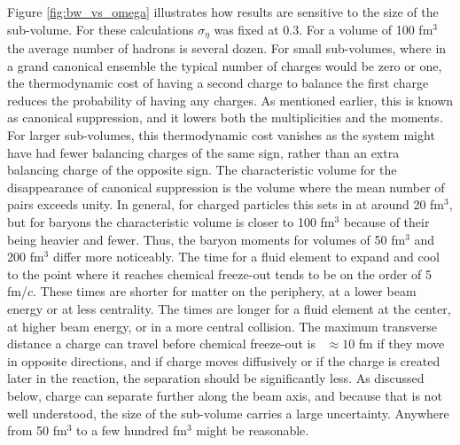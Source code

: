 Figure \ref{fig:bw_vs_omega} illustrates how results are sensitive to the size of the sub-volume. For these calculations $\sigma_\eta$ was fixed at 0.3. For a volume of 100 fm$^3$ the average number of hadrons is several dozen. For small sub-volumes, where in a grand canonical ensemble the typical number of charges would be zero or one, the thermodynamic cost of having a second charge to balance the first charge reduces the probability of having any charges. As mentioned earlier, this is known as canonical suppression, and it lowers both the multiplicities and the moments. For larger sub-volumes, this thermodynamic cost vanishes as the system might have had fewer balancing charges of the same sign, rather than an extra balancing charge of the opposite sign. The characteristic volume for the disappearance of canonical suppression is the volume where the mean number of pairs exceeds unity. In general, for charged particles this sets in at around 20 fm$^3$, but for baryons the characteristic volume is closer to 100 fm$^3$ because of their being heavier and fewer. Thus, the baryon moments for volumes of 50 fm$^3$ and 200 fm$^3$ differ more noticeably. The time for a fluid element to expand and cool to the point where it reaches chemical freeze-out tends to be on the order of 5 fm/$c$. These times are shorter for matter on the periphery, at a lower beam energy or at less centrality. The times are longer for a fluid element at the center, at higher beam energy, or in a more central collision. The maximum transverse distance a charge can travel before chemical freeze-out is ~$\approx 10$ fm if they move in opposite directions, and if charge moves diffusively or if the charge is created later in the reaction, the separation should be significantly less. As discussed below, charge can separate further along the beam axis, and because that is not well understood, the size of the sub-volume carries a large uncertainty. Anywhere from 50 fm$^3$ to a few hundred fm$^3$ might be reasonable. 

